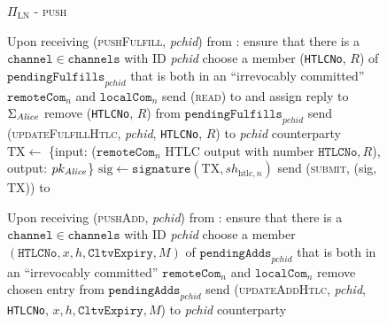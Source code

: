   \begin{figure}[H]
    \begin{protocolbox}{$\Pi_{\mathrm{LN}}$ - \textsc{push}}
      \begin{algorithmic}[1]
        \State Upon receiving (\textsc{pushFulfill}, \textit{pchid}) from
        \environment:
        \Indent
          \State ensure that there is a $\mathtt{channel} \in \mathtt{channels}$
          with ID \textit{pchid}
          \State choose a member (\texttt{HTLCNo}, $R$) of
          $\mathtt{pendingFulfills}_{\mathit{pchid}}$ that is both in an
          ``irrevocably committed'' $\mathtt{remoteCom}_n$ and
          $\mathtt{localCom}_n$
          \State send (\textsc{read}) to \ledger{} and assign reply to
          $\Sigma_{\mathit{Alice}}$
          \State remove (\texttt{HTLCNo}, $R$) from
          $\mathtt{pendingFulfills}_{\mathit{pchid}}$
            \State send (\textsc{updateFulfillHtlc}, \textit{pchid},
            \texttt{HTLCNo}, $R$) to \textit{pchid} counterparty
          \Else \ 
            \State $\mathrm{TX} \gets$ \{input: ($\mathtt{remoteCom}_n$ HTLC
            output with number $\mathtt{HTLCNo}, R$), output:
            $pk_{\mathit{Alice}}$\}
            \State $\mathrm{sig} \gets \mathtt{signature}\left(\mathrm{TX},
            sh_{\mathrm{htlc}, n}\right)$
            \State send (\textsc{submit}, (sig, TX)) to \ledger{}
          \EndIf
        \EndIndent
        \Statex

        \State Upon receiving (\textsc{pushAdd}, \textit{pchid}) from
        \environment:
        \Indent
          \State ensure that there is a $\mathtt{channel} \in \mathtt{channels}$
          with ID \textit{pchid}
          \State choose a member $\left(\mathtt{HTLCNo}, x, h,
          \mathtt{CltvExpiry}, M\right)$ of
          $\mathtt{pendingAdds}_{\mathit{pchid}}$ that is both in an
          ``irrevocably committed'' $\mathtt{remoteCom}_n$ and
          $\mathtt{localCom}_n$
          \label{alg:protocol:pay:pushadd:choose}
          \State remove chosen entry from
          $\mathtt{pendingAdds}_{\mathit{pchid}}$
          \State send (\textsc{updateAddHtlc}, \textit{pchid}, \texttt{HTLCNo},
          $x, h, \mathtt{CltvExpiry}, M$) to \textit{pchid} counterparty
        \EndIndent
        \Statex


\end{algorithmic}
\end{protocolbox}
\end{figure}
